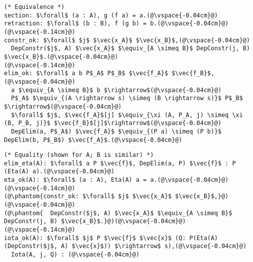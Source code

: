 \begin{figure*}
\begin{minipage}{0.43\textwidth}
\begin{lstlisting}
(* Equivalence *)
section: $\forall$ (a : A), g (f a) = a.(@\vspace{-0.04cm}@)
retraction: $\forall$ (b : B), f (g b) = b.(@\vspace{-0.04cm}@)
(@\vspace{-0.14cm}@)
constr_ok: $\forall$ $j$ $\vec{x_A}$ $\vec{x_B}$,(@\vspace{-0.04cm}@)
  DepConstr($j$, A) $\vec{x_A}$ $\equiv_{A \simeq B}$ DepConstr(j, B) $\vec{x_B}$.(@\vspace{-0.04cm}@)
(@\vspace{-0.14cm}@)
elim_ok: $\forall$ a b P$_A$ P$_B$ $\vec{f_A}$ $\vec{f_B}$,(@\vspace{-0.04cm}@)
  a $\equiv_{A \simeq B}$ b $\rightarrow$(@\vspace{-0.04cm}@)
  P$_A$ $\equiv_{(A \rightarrow s) \simeq (B \rightarrow s)}$ P$_B$ $\rightarrow$(@\vspace{-0.04cm}@)
  $\forall$ $j$, $\vec{f_A}$[j] $\equiv_{\xi (A, P_A, j) \simeq \xi (B, P_B, j)}$ $\vec{f_B}$[j]$\rightarrow$(@\vspace{-0.04cm}@)
  DepElim(a, P$_A$) $\vec{f_A}$ $\equiv_{(P a) \simeq (P b)}$ DepElim(b, P$_B$) $\vec{f_A}$.(@\vspace{-0.04cm}@)
\end{lstlisting}
\end{minipage}
\hfill
\begin{minipage}{0.56\textwidth}
\begin{lstlisting}
(* Equality (shown for A; B is similar) *)
elim_eta(A): $\forall$ a P $\vec{f}$, DepElim(a, P) $\vec{f}$ : P (Eta(A) a).(@\vspace{-0.04cm}@)
eta_ok(A): $\forall$ (a : A), Eta(A) a = a.(@\vspace{-0.04cm}@)
(@\vspace{-0.14cm}@)
(@\phantom{constr_ok: $\forall$ $j$ $\vec{x_A}$ $\vec{x_B}$,}@)(@\vspace{-0.04cm}@)
(@\phantom{  DepConstr($j$, A) $\vec{x_A}$ $\equiv_{A \simeq B}$ DepConstr(j, B) $\vec{x_B}$.}@)(@\vspace{-0.04cm}@)
(@\vspace{-0.14cm}@)
iota_ok(A): $\forall$ $j$ P $\vec{f}$ $\vec{x}$ (Q: P(Eta(A) (DepConstr($j$, A) $\vec{x}$)) $\rightarrow$ s),(@\vspace{-0.04cm}@)
  Iota(A, j, Q) : (@\vspace{-0.04cm}@)

\end{lstlisting}
\end{minipage}
\end{figure*}
